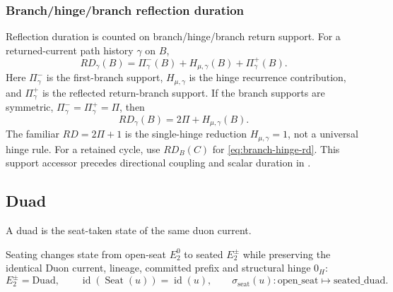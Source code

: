 \subsubsection{Branch/hinge/branch reflection duration}\label{subsec:branch-hinge-rd}
Reflection duration is counted on branch/hinge/branch return support. For a returned-current path history \(\gamma\) on \(B\),
\begin{equation}
RD_\gamma(B)
=
\Pi^-_\gamma(B)
+
H_{\mu,\gamma}(B)
+
\Pi^+_\gamma(B).
\label{eq:branch-hinge-rd}
\end{equation}
Here \(\Pi^-_\gamma\) is the first-branch support, \(H_{\mu,\gamma}\) is the hinge recurrence contribution, and \(\Pi^+_\gamma\) is the reflected return-branch support. If the branch supports are symmetric, \(\Pi^-_\gamma=\Pi^+_\gamma=\Pi\), then
\begin{equation}
RD_\gamma(B)=2\Pi+H_{\mu,\gamma}(B).
\label{eq:branch-hinge-rd-symmetric}
\end{equation}
The familiar \(RD=2\Pi+1\) is the single-hinge reduction \(H_{\mu,\gamma}=1\), not a universal hinge rule. For a retained cycle, use \(RD_B(C)\) for \eqref{eq:branch-hinge-rd}.
This support accessor precedes directional coupling and scalar duration in
.

\subsection{Duad}\label{subsec:duad}
\begin{definition}
A duad is the seat-taken state of the same duon current.
\end{definition}
Seating changes state from open-seat \(E_2^0\) to seated \(E_2^{\pm}\) while preserving the identical Duon current, lineage, committed prefix and structural hinge \(0_H\):
\begin{equation}
E_2^{\pm}=\mathrm{Duad},
\qquad
\operatorname{id}\!\left(\operatorname{Seat}(u)\right)=\operatorname{id}(u),
\qquad
\sigma_{\mathrm{seat}}(u):\mathrm{open\_seat}\longmapsto\mathrm{seated\_duad}.
\label{eq:duad-same-current}
\end{equation}



